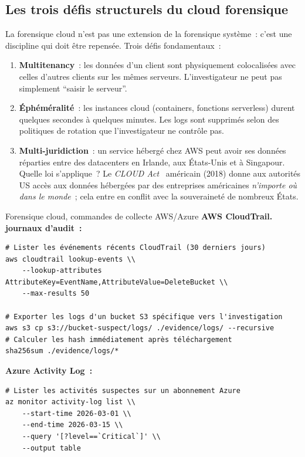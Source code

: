 \subsection{Les trois défis structurels du cloud forensique}

La forensique cloud n'est pas une extension de la forensique système~:
c'est une discipline qui doit être repensée. Trois défis fondamentaux~:

\begin{enumerate}
    \item \textbf{Multitenancy}~: les données d'un client sont physiquement
          colocalisées avec celles d'autres clients sur les mêmes serveurs.
          L'investigateur ne peut pas simplement ``saisir le serveur''.

    \item \textbf{Éphéméralité}~: les instances cloud (containers,
          fonctions serverless) durent quelques secondes à quelques minutes.
          Les logs sont supprimés selon des politiques de rotation que
          l'investigateur ne contrôle pas.

    \item \textbf{Multi-juridiction}~: un service hébergé chez AWS peut
          avoir ses données réparties entre des datacenters en Irlande,
          aux États-Unis et à Singapour. Quelle loi s'applique~?
          Le \textit{CLOUD Act}~\cite{cloudact2018} américain (2018) donne aux autorités US
          accès aux données hébergées par des entreprises américaines
          \emph{n'importe où dans le monde}~; cela entre en conflit avec
          la souveraineté de nombreux États.
\end{enumerate}

\begin{boxoutils}{Forensique cloud, commandes de collecte AWS/Azure}
\textbf{AWS CloudTrail. journaux d'audit~:}
\begin{lstlisting}[language=bash_forensique]
# Lister les événements récents CloudTrail (30 derniers jours)
aws cloudtrail lookup-events \\
    --lookup-attributes AttributeKey=EventName,AttributeValue=DeleteBucket \\
    --max-results 50

# Exporter les logs d'un bucket S3 spécifique vers l'investigation
aws s3 cp s3://bucket-suspect/logs/ ./evidence/logs/ --recursive
# Calculer les hash immédiatement après téléchargement
sha256sum ./evidence/logs/*
\end{lstlisting}

\textbf{Azure Activity Log~:}
\begin{lstlisting}[language=bash_forensique]
# Lister les activités suspectes sur un abonnement Azure
az monitor activity-log list \\
    --start-time 2026-03-01 \\
    --end-time 2026-03-15 \\
    --query '[?level==`Critical`]' \\
    --output table
\end{lstlisting}
\end{boxoutils}

